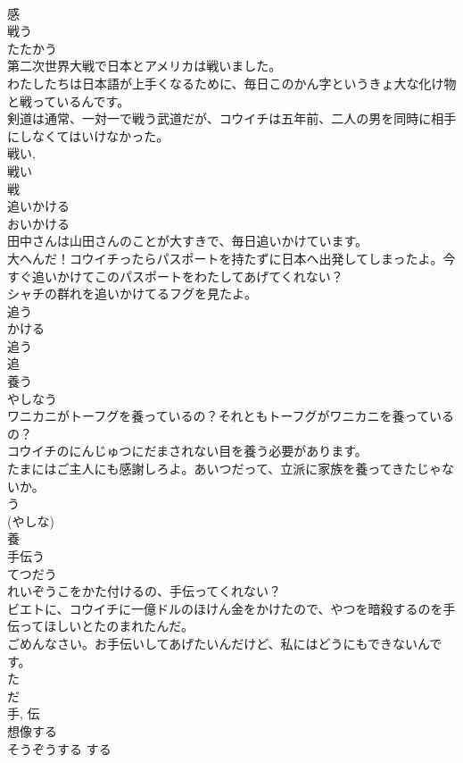 \documentclass[8pt]{extreport}
\begin{document}
\begin{CJK}{UTF8}{min}
\\	感	
\\	戦う	
\\	たたかう	
\\	第二次世界大戦で日本とアメリカは戦いました。	
\\	わたしたちは日本語が上手くなるために、毎日このかん字というきょ大な化け物と戦っているんです。	
\\	剣道は通常、一対一で戦う武道だが、コウイチは五年前、二人の男を同時に相手にしなくてはいけなかった。	
\\	戦い, 
\\	戦い 
\\	戦	
\\	追いかける	
\\	おいかける	
\\	田中さんは山田さんのことが大すきで、毎日追いかけています。	
\\	大へんだ！コウイチったらパスポートを持たずに日本へ出発してしまったよ。今すぐ追いかけてこのパスポートをわたしてあげてくれない？	
\\	シャチの群れを追いかけてるフグを見たよ。	
\\	追う 
\\	かける 
\\	追う 
\\	追	
\\	養う	
\\	やしなう	
\\	ワニカニがトーフグを養っているの？それともトーフグがワニカニを養っているの？	
\\	コウイチのにんじゅつにだまされない目を養う必要があります。	
\\	たまにはご主人にも感謝しろよ。あいつだって、立派に家族を養ってきたじゃないか。	
\\	う 
\\	(やしな) 
\\	養	
\\	手伝う	
\\	てつだう	
\\	れいぞうこをかた付けるの、手伝ってくれない？	
\\	ビエトに、コウイチに一億ドルのほけん金をかけたので、やつを暗殺するのを手伝ってほしいとたのまれたんだ。	
\\	ごめんなさい。お手伝いしてあげたいんだけど、私にはどうにもできないんです。	
\\	た 
\\	だ 
\\	手, 伝	
\\	想像する	
\\	そうぞうする	する 

\end{CJK}
\end{document}
